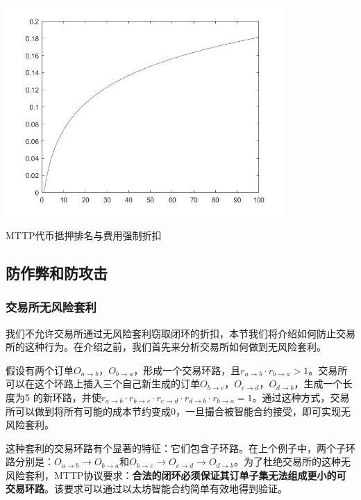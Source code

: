 \documentclass[UTF8,nofonts]{ctexart}
\makeatletter
\newenvironment{figurehere}
  {\def\@captype{figure}}
  {}
\makeatother
\begin{document}
\begin{center}
\begin{figurehere}
\includegraphics[height=8cm]{images/exchange-discount.png}
\caption{MTTP代币抵押排名与费用强制折扣}
\label{fig:MTTPprotocol}
\end{figurehere}
\end{center}

\subsection{防作弊和防攻击}

\subsubsection{交易所无风险套利}
我们不允许交易所通过无风险套利窃取闭环的折扣，本节我们将介绍如何防止交易所的这种行为。在介绍之前，我们首先来分析交易所如何做到无风险套利。

假设有两个订单$O_{a\rightarrow b}$，$O_{b\rightarrow a}$，形成一个交易环路，且$r_{a\rightarrow b} \cdot r_{b\rightarrow a} > 1$。交易所可以在这个环路上插入三个自己新生成的订单$O_{b\rightarrow c}$，$O_{c\rightarrow d}$，$O_{d\rightarrow b}$，生成一个长度为5
的新环路，并使$r_{a\rightarrow b}  \cdot r_{b\rightarrow c} \cdot r_{c\rightarrow d}\cdot r_{d\rightarrow b}\cdot r_{b\rightarrow a}  = 1$。通过这种方式，交易所可以做到将所有可能的成本节约变成0，一旦撮合被智能合约接受，即可实现无风险套利。

这种套利的交易环路有个显著的特征：它们包含子环路。在上个例子中，两个子环路分别是：$O_{a\rightarrow b}\rightarrow O_{b\rightarrow a}$和$O_{b\rightarrow c}\rightarrow O_{c\rightarrow d}\rightarrow O_{d\rightarrow b}$。为了杜绝交易所的这种无风险套利，MTTP协议要求：{\bfseries 合法的闭环必须保证其订单子集无法组成更小的可交易环路}。该要求可以通过以太坊智能合约简单有效地得到验证。
\end{document}
